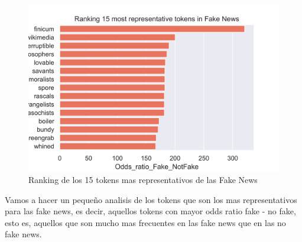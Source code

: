 \documentclass[
  11pt,
  a4paper,
]{article}
\begin{document}
\begin{figure}
\centering
\includegraphics{p3.png}
\caption{Ranking de los 15 tokens mas representativos de las Fake News}
\end{figure}

Vamos a hacer un pequeño analisis de los tokens que son los mas
representativos para las fake news, es decir, aquellos tokens con mayor
odds ratio fake - no fake, esto es, aquellos que son mucho mas
frecuentes en las fake news que en las no fake news.
\end{document}
